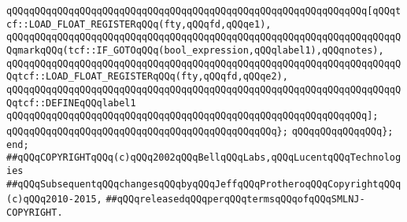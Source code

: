 \newline
\verb|qQQqqQQqqQQqqQQqqQQqqQQqqQQqqQQqqQQqqQQqqQQqqQQqqQQqqQQqqQQqqQQq[qQQqtcf::LOAD_FLOAT_REGISTERqQQq(fty,qQQqfd,qQQqe1),|\newline
\verb|qQQqqQQqqQQqqQQqqQQqqQQqqQQqqQQqqQQqqQQqqQQqqQQqqQQqqQQqqQQqqQQqqQQqqQQqmarkqQQq(tcf::IF_GOTOqQQq(bool_expression,qQQqlabel1),qQQqnotes),|\newline
\verb|qQQqqQQqqQQqqQQqqQQqqQQqqQQqqQQqqQQqqQQqqQQqqQQqqQQqqQQqqQQqqQQqqQQqqQQqtcf::LOAD_FLOAT_REGISTERqQQq(fty,qQQqfd,qQQqe2),|\newline
\verb|qQQqqQQqqQQqqQQqqQQqqQQqqQQqqQQqqQQqqQQqqQQqqQQqqQQqqQQqqQQqqQQqqQQqqQQqtcf::DEFINEqQQqlabel1|\newline
\verb|qQQqqQQqqQQqqQQqqQQqqQQqqQQqqQQqqQQqqQQqqQQqqQQqqQQqqQQqqQQqqQQq];|\newline
\verb|qQQqqQQqqQQqqQQqqQQqqQQqqQQqqQQqqQQqqQQqqQQqqQQq};|\newline
\verb|qQQqqQQqqQQqqQQq};|\newline
\verb|end;|\newline
\newline
\verb|##qQQqCOPYRIGHTqQQq(c)qQQq2002qQQqBellqQQqLabs,qQQqLucentqQQqTechnologies|\newline
\verb|##qQQqSubsequentqQQqchangesqQQqbyqQQqJeffqQQqProtheroqQQqCopyrightqQQq(c)qQQq2010-2015,|\newline
\verb|##qQQqreleasedqQQqperqQQqtermsqQQqofqQQqSMLNJ-COPYRIGHT.|\newline

